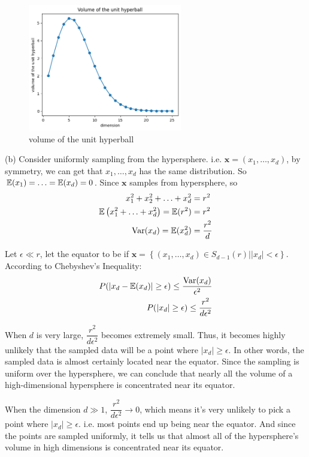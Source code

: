 \begin{homeworkProblem}
\begin{figure}[h]
    \centering
    \includegraphics[width=0.6\textwidth]{./figure/p8/volume.png}
    \caption{volume of the unit hyperball}
\end{figure}


(b) Consider uniformly sampling from the hypersphere. i.e. $\boldsymbol{x}=(x_1,\ldots,x_d)$, by symmetry, we can get that $x_1,\ldots,x_d$ has the same distribution. So $\mathbb{E}(x_1)=\ldots=\mathbb{E}(x_d)=0$. Since $\boldsymbol{x}$ samples from hypersphere, so
\begin{align*}
x_1^2 + x_2^2 + \ldots + x_d^2 &= r^2 \\
\mathbb{E}\left(x_1^2 + \ldots + x_d^2\right) = \mathbb{E}(r^2) &= r^2 \\
\mathrm{Var}(x_d) = \mathbb{E}(x_d^2) &= \dfrac{r^2}{d}
\end{align*}

Let $\epsilon \ll r$, let the equator to be if $\boldsymbol{x}=\left\{(x_1,\ldots,x_d)\in S_{d-1}(r) \big| |x_d| < \epsilon\right\}$.
According to Chebyshev's Inequality:
\begin{align*}
P(|x_d - \mathbb{E}(x_d)| \geq \epsilon) \leq \frac{\mathrm{Var}(x_d)}{\epsilon^2} \\
P(|x_d| \geq \epsilon) \leq \dfrac{r^2}{d \epsilon^2}
\end{align*}



When $d$ is very large, $\dfrac{r^2}{d \epsilon^2} $ becomes extremely small.
Thus, it becomes highly unlikely that the sampled data will be a point where $ |x_d| \geq \epsilon $.
In other words, the sampled data is almost certainly located near the equator.
Since the sampling is uniform over the hypersphere,
we can conclude that nearly all the volume of a high-dimensional hypersphere is concentrated near its equator.


When the dimension $d\gg 1$, $\dfrac{r^2}{d \epsilon^2}\to 0$, which means it's very unlikely to pick a point where $|x_d| \geq \epsilon$. i.e. most points end up being near the equator. And since the points are sampled uniformly, it tells us that almost all of the hypersphere's volume in high dimensions is concentrated near its equator.



\end{homeworkProblem}
